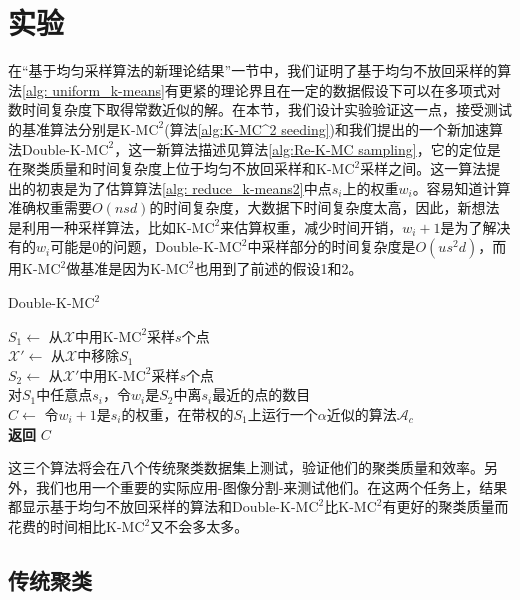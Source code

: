 \section{实验}
在“基于均匀采样算法的新理论结果”一节中，我们证明了基于均匀不放回采样的算法\ref{alg: uniform_k-means}有更紧的理论界且在一定的数据假设下可以在多项式对数时间复杂度下取得常数近似的解。在本节，我们设计实验验证这一点，接受测试的基准算法分别是K-M$\text{C}^2$(算法\ref{alg:K-MC^2 seeding})和我们提出的一个新加速算法Double-K-M$\text{C}^2$，这一新算法描述见算法\ref{alg:Re-K-MC sampling}，它的定位是在聚类质量和时间复杂度上位于均匀不放回采样和K-M$\text{C}^2$采样之间。这一算法提出的初衷是为了估算算法\ref{alg: reduce_k-means2}中点$s_i$上的权重$w_i$。容易知道计算准确权重需要$O(nsd)$的时间复杂度，大数据下时间复杂度太高，因此，新想法是利用一种采样算法，比如K-M$\text{C}^2$来估算权重，减少时间开销，$w_i + 1$是为了解决有的$w_i$可能是0的问题，Double-K-M$\text{C}^2$中采样部分的时间复杂度是$O(us^2 d)$，而用K-M$\text{C}^2$做基准是因为K-M$\text{C}^2$也用到了前述的假设1和2。
\begin{algorithm}
    \caption{Double-K-M$\text{C}^2$}\label{alg:Re-K-MC sampling}
    $S_1 \gets$ 从$\mathcal{X}$中用K-M$\text{C}^2$采样$s$个点 \\
    $\mathcal{X}' \gets $ 从$\mathcal{X}$中移除$S_1$ \\
    $S_2 \gets$ 从$\mathcal{X}'$中用K-M$\text{C}^2$采样$s$个点 \\
    对$S_1$中任意点$s_i$，令$w_i$是$S_2$中离$s_i$最近的点的数目 \\
    $C \gets$ 令$w_i + 1$是$s_i$的权重，在带权的$S_1$上运行一个$\alpha$近似的算法$\mathcal{A}_c$ \\
    \textbf{返回} $C$
\end{algorithm}
这三个算法将会在八个传统聚类数据集上测试，验证他们的聚类质量和效率。另外，我们也用一个重要的实际应用-图像分割-来测试他们。在这两个任务上，结果都显示基于均匀不放回采样的算法和Double-K-M$\text{C}^2$比K-M$\text{C}^2$有更好的聚类质量而花费的时间相比K-M$\text{C}^2$又不会多太多。

\subsection{传统聚类}

